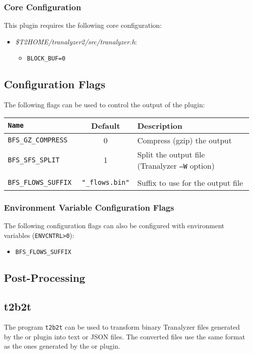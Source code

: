 \documentclass[documentation]{subfiles}
\begin{document}
\subsubsection{Core Configuration}
This plugin requires the following core configuration:
\begin{itemize}
    \item {\em \$T2HOME/tranalyzer2/src/tranalyzer.h}:
        \begin{itemize}
            \item {\tt BLOCK\_BUF=0}
        \end{itemize}
\end{itemize}

\subsection{Configuration Flags}

The following flags can be used to control the output of the plugin:

\begin{longtable}{>{\tt}lcl}
    \toprule
    {\bf Name} & {\bf Default} & {\bf Description} \\
    \midrule\endhead%
    BFS\_GZ\_COMPRESS  & 0                         & Compress (gzip) the output\\
    BFS\_SFS\_SPLIT    & 1                         & Split the output file (Tranalyzer {\tt --W} option)\\\\
    BFS\_FLOWS\_SUFFIX & {\tt\small "\_flows.bin"} & Suffix to use for the output file\\
    \bottomrule
\end{longtable}

\subsubsection{Environment Variable Configuration Flags}
The following configuration flags can also be configured with environment variables ({\tt ENVCNTRL>0}):
\begin{itemize}
    \item {\tt BFS\_FLOWS\_SUFFIX}
\end{itemize}

\subsection{Post-Processing}

\subsection{t2b2t}
The program {\tt t2b2t} can be used to transform binary Tranalyzer files generated by the  or  plugin into text or JSON files.
The converted files use the same format as the ones generated by the  or  plugin.\\
\end{document}
